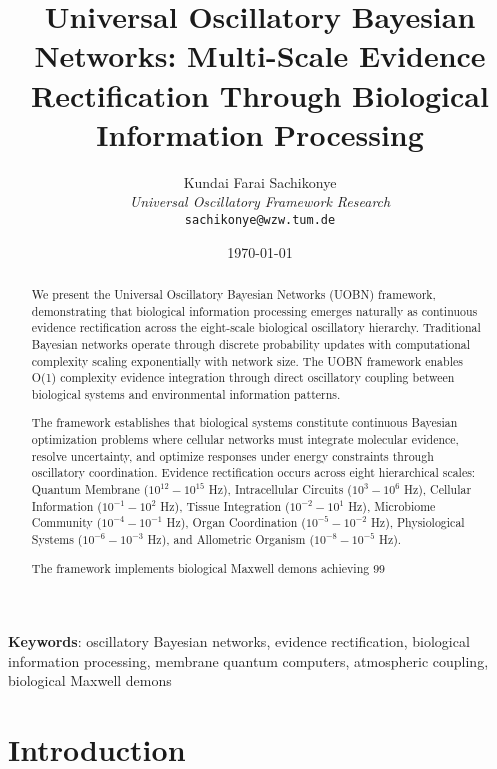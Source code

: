 \documentclass[12pt,a4paper]{article}
\title{Universal Oscillatory Bayesian Networks: Multi-Scale Evidence Rectification Through Biological Information Processing}
\author{
Kundai Farai Sachikonye\\
\textit{Universal Oscillatory Framework Research}\\
\texttt{sachikonye@wzw.tum.de}
}
\date{\today}
\begin{document}
\maketitle

\begin{abstract}
We present the Universal Oscillatory Bayesian Networks (UOBN) framework, demonstrating that biological information processing emerges naturally as continuous evidence rectification across the eight-scale biological oscillatory hierarchy. Traditional Bayesian networks operate through discrete probability updates with computational complexity scaling exponentially with network size. The UOBN framework enables O(1) complexity evidence integration through direct oscillatory coupling between biological systems and environmental information patterns.

The framework establishes that biological systems constitute continuous Bayesian optimization problems where cellular networks must integrate molecular evidence, resolve uncertainty, and optimize responses under energy constraints through oscillatory coordination. Evidence rectification occurs across eight hierarchical scales: Quantum Membrane ($10^{12}-10^{15}$ Hz), Intracellular Circuits ($10^3-10^6$ Hz), Cellular Information ($10^{-1}-10^2$ Hz), Tissue Integration ($10^{-2}-10^1$ Hz), Microbiome Community ($10^{-4}-10^{-1}$ Hz), Organ Coordination ($10^{-5}-10^{-2}$ Hz), Physiological Systems ($10^{-6}-10^{-3}$ Hz), and Allometric Organism ($10^{-8}-10^{-5}$ Hz).

The framework implements biological Maxwell demons achieving 99%
\end{abstract}

\textbf{Keywords}: oscillatory Bayesian networks, evidence rectification, biological information processing, membrane quantum computers, atmospheric coupling, biological Maxwell demons

\section{Introduction}
\end{document}
